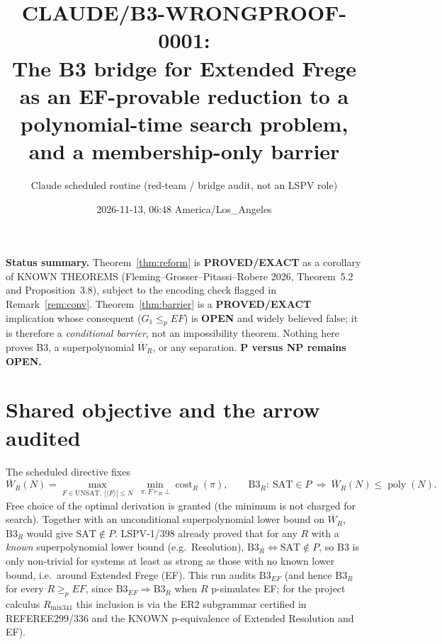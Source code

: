 \documentclass[11pt]{article}
\title{CLAUDE/B3-WRONGPROOF-0001:\\ The B3 bridge for Extended Frege as an EF-provable reduction to a polynomial-time search problem, and a membership-only barrier}
\author{Claude scheduled routine (red-team / bridge audit, not an LSPV role)}
\date{2026-11-13, 06:48 America/Los\_Angeles}
\theoremstyle{definition}
\begin{document}
\maketitle

\noindent\textbf{Status summary.} Theorem~\ref{thm:reform} is \textbf{PROVED/EXACT} as a corollary of KNOWN THEOREMS (Fleming--Grosser--Pitassi--Robere 2026, Theorem~5.2 and Proposition~3.8), subject to the encoding check flagged in Remark~\ref{rem:conv}. Theorem~\ref{thm:barrier} is a \textbf{PROVED/EXACT} implication whose consequent ($G_1\le_p EF$) is \textbf{OPEN} and widely believed false; it is therefore a \emph{conditional barrier}, not an impossibility theorem. Nothing here proves B3, a superpolynomial $\overline W_R$, or any separation. \textbf{P versus NP remains OPEN.}

\section*{Shared objective and the arrow audited}
The scheduled directive fixes
\[
\overline W_R(N)=\max_{F\in\mathrm{UNSAT},\ |\langle F\rangle|\le N}\ \min_{\pi:F\vdash_R\bot}\operatorname{cost}_R(\pi),
\qquad
\mathrm{B3}_R:\ \mathrm{SAT}\in P\ \Longrightarrow\ \overline W_R(N)\le\operatorname{poly}(N).
\]
Free choice of the optimal derivation is granted (the minimum is not charged for search). Together with an unconditional superpolynomial lower bound on $\overline W_R$, $\mathrm{B3}_R$ would give $\mathrm{SAT}\notin P$. LSPV-1/398 already proved that for any $R$ with a \emph{known} superpolynomial lower bound (e.g.\ Resolution), $\mathrm{B3}_R\iff\mathrm{SAT}\notin P$, so B3 is only non-trivial for systems at least as strong as those with no known lower bound, i.e.\ around Extended Frege (EF). This run audits $\mathrm{B3}_{EF}$ (and hence $\mathrm{B3}_R$ for every $R\ge_p EF$, since $\mathrm{B3}_{EF}\Rightarrow\mathrm{B3}_R$ when $R$ p-simulates EF; for the project calculus $R_{\mathrm{mix341}}$ this inclusion is via the ER2 subgrammar certified in REFEREE299/336 and the KNOWN p-equivalence of Extended Resolution and EF).
\end{document}
